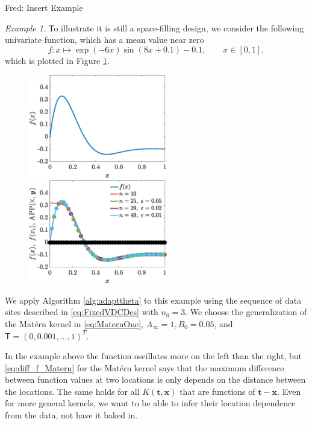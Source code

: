\documentclass[]{mcom-l}
\theoremstyle{theorem}
\theoremstyle{remark}
\newtheorem{example}{Example}
\newcommand{\mT}{\mathsf{T}}
\newcommand{\bx}{{\boldsymbol{x}}}
\newcommand{\bt}{{\boldsymbol{t}}}
\newcommand{\FredNote}[1]{{\color{blue}Fred: #1}}
\begin{document}
\FredNote{Insert Example}
\begin{example}
\label{ex:compfun}
To illustrate it is still a space-filling design,  we consider the following univariate function, which has a mean value near zero
	\begin{equation}
	f: x \mapsto 
 \exp(-6x)\sin(8x+0.1) - 0.1,  \qquad x \in [0,1],
	\end{equation}
	which is plotted in Figure \ref{fig:ex4a}. 
		
	\begin{figure}[H]
		\centering
		\includegraphics[height = 4.5cm]{ProgramsImages/LeftPeakFunPlot.eps} \qquad
		\includegraphics[height = 4.5cm]{ProgramsImages/Alg3_LeftPeakFun_Matern_adapt_th_EmpBayesAx_theta_1.eps} \qquad		
		\caption{ \label{fig:ex4a}}
	\end{figure}
	We apply Algorithm \ref{alg:adapttheta} to this example using the sequence of data sites described in \eqref{eq:FixedVDCDes} with $n_0=3$. We choose the generalization of the Mat\'ern kernel in \eqref{eq:MaternOne},  $A_\infty =1, B_0 = 0.05$, and $\mT = (0, 0.001, \ldots, 1)^T$. 
	


		
	

\end{example}

 
In the example above the function oscillates more on the left than the right, but \eqref{eq:diff_f_Matern} for the Mat\'ern kernel says that the maximum difference between function values at two locations is only depends on the distance between the locations.  The same holds for all $K(\bt ,\bx)$ that are  functions of $\bt - \bx$.  Even for more general kernels, we want to be able to infer their location dependence from the data, not have it baked in.
\end{document}
